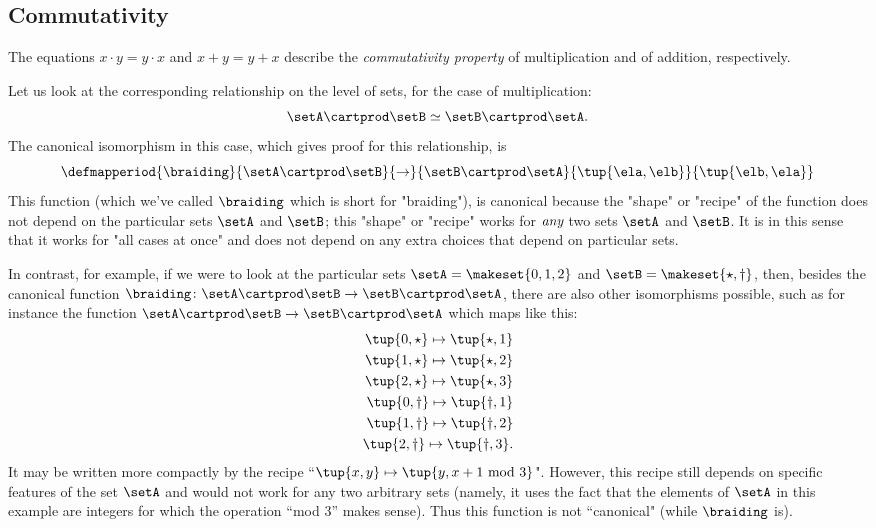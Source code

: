 \subsection{Commutativity}
   
The equations $x \cdot y = y \cdot x$ and $x + y = y + x$ describe the \emph{commutativity property} of multiplication and of addition, respectively. 

Let us look at the corresponding relationship on the level of sets, for the case of multiplication:
\begin{equation}
\setA \cartprod \setB \simeq \setB \cartprod \setA. 
\end{equation}
The canonical isomorphism in this case, which gives proof for this relationship, is
 \begin{equation}
 \defmapperiod{
           \braiding
        }{
            \setA \cartprod \setB
        }{
            \to
        }{
            \setB \cartprod \setA
        }{
            \tup{\ela, \elb}
        }{
            \tup{\elb, \ela}
        }
\end{equation}
This function (which we've called $\braiding$ which is short for "braiding"), is canonical because the "shape" or "recipe" of the function does not depend on the particular sets $\setA$ and $\setB$; this "shape" or "recipe" works for $\emph{any}$ two sets $\setA$ and $\setB$. It is in this sense that it works for "all cases at once" and does not depend on any extra choices that depend on particular sets.

In contrast, for example, if we were to look at the particular sets $\setA = \makeset{0, 1, 2}$ and $\setB = \makeset{\star, \dagger}$, then, besides the canonical function $\braiding \colon \setA \cartprod \setB \to \setB \cartprod \setA$, there are also other isomorphisms possible, such as for instance the function $\setA \cartprod \setB \to \setB \cartprod \setA$ which maps like this: 
\begin{align}
\tup{0, \star} \mapsto \tup{\star, 1} \\
\tup{1, \star} \mapsto \tup{\star, 2} \\
\tup{2, \star} \mapsto \tup{\star, 3} \\
\tup{0, \dagger} \mapsto \tup{\dagger, 1} \\
\tup{1, \dagger} \mapsto \tup{\dagger, 2} \\
\tup{2, \dagger} \mapsto \tup{\dagger, 3}.
\end{align}
It may be written more compactly by the recipe ``$\tup{x, y} \mapsto \tup{y, x +1 \text{ mod } 3}$". However, this recipe still depends on specific features of the  set $\setA$ and would not work for any two arbitrary sets (namely, it uses the fact that the elements of $\setA$ in this example are integers for which the operation ``mod 3'' makes sense). Thus this function is not ``canonical" (while $\braiding$ is). 

